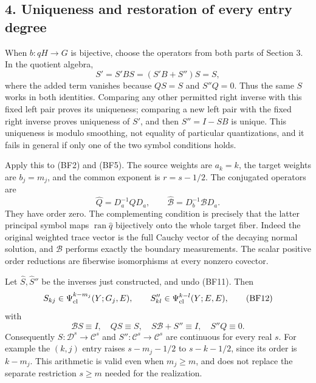 \documentclass[
  11pt,
]{article}
\makeatletter
\let\ReaderOriginalAnchorStart\hyper@anchorstart
\let\ReaderOriginalAnchorEnd\hyper@anchorend
\let\ReaderPendingAliases\@empty
\def\ReaderArmAliases#1{\gdef\ReaderPendingAliases{#1}}
\def\hyper@anchorstart#1{\ReaderIfNativeAnchorTF{#1}{\ReaderPendingAliases\global\let\ReaderPendingAliases\@empty}{}\ReaderOriginalAnchorStart{#1}}
\makeatother
\begin{document}
\ReaderArmAliases{\ReaderOriginalAnchorStart{AN03-GFB-004}\ReaderOriginalAnchorEnd\begingroup\expandafter\def\csname @currentHref\endcsname{AN03-GFB-004}\label{AN03-GFB-004}\endgroup\ReaderOriginalAnchorStart{an03-gfb-004-uniqueness-and-restoration-of-every-entry-degree}\ReaderOriginalAnchorEnd\begingroup\expandafter\def\csname @currentHref\endcsname{an03-gfb-004-uniqueness-and-restoration-of-every-entry-degree}\label{an03-gfb-004-uniqueness-and-restoration-of-every-entry-degree}\endgroup\ReaderOriginalAnchorStart{4-uniqueness-and-restoration-of-every-entry-degree}\ReaderOriginalAnchorEnd\begingroup\expandafter\def\csname @currentHref\endcsname{4-uniqueness-and-restoration-of-every-entry-degree}\label{4-uniqueness-and-restoration-of-every-entry-degree}\endgroup\ReaderOriginalAnchorStart{uniqueness-and-restoration-of-every-entry-degree}\ReaderOriginalAnchorEnd}
\subsection{4. Uniqueness and restoration of every entry
degree}\label{uniqueness-and-restoration-of-every-entry-degree}

When \(b:qH\to G\) is bijective, choose the operators from both parts of
Section 3. In the quotient algebra, \[
 S'=S'BS=(S'B+S'')S=S,
 \tag{BF10}
\] where the added term vanishes because \(QS=S\) and \(S''Q=0\). Thus
the same \(S\) works in both identities. Comparing any other permitted
right inverse with this fixed left pair proves its uniqueness; comparing
a new left pair with the fixed right inverse proves uniqueness of
\(S'\), and then \(S''=I-SB\) is unique. This uniqueness is modulo
smoothing, not equality of particular quantizations, and it fails in
general if only one of the two symbol conditions holds.

Apply this to (BF2) and (BF5). The source weights are \(a_k=k\), the
target weights are \(b_j=m_j\), and the common exponent is \(r=s-1/2\).
The conjugated operators are \[
 \widehat Q=D_a^{-1}QD_a,\qquad
 \widehat{\mathcal B}=D_b^{-1}\mathcal B D_a.
 \tag{BF11}
\] They have order zero. The complementing condition is precisely that
the latter principal symbol maps \(\operatorname{ran}\widehat q\)
bijectively onto the whole target fiber. Indeed the original weighted
trace vector is the full Cauchy vector of the decaying normal solution,
and \(\mathcal B\) performs exactly the boundary measurements. The
scalar positive order reductions are fiberwise isomorphisms at every
nonzero covector.

Let \(\widehat S,\widehat S''\) be the inverses just constructed, and
undo (BF11). Then \[
 S_{kj}\in\Psi^{k-m_j}_{\rm cl}(Y;G_j,E),\qquad
 S''_{kl}\in\Psi^{k-l}_{\rm cl}(Y;E,E),
 \tag{BF12}
\] with \[
 \mathcal BS\equiv I,\quad QS\equiv S,\quad
 S\mathcal B+S''\equiv I,\quad S''Q\equiv0.
 \tag{BF13}
\] Consequently \(S:\mathcal D^s\to\mathcal C^s\) and
\(S'':\mathcal C^s\to\mathcal C^s\) are continuous for every real \(s\).
For example the \((k,j)\) entry raises \(s-m_j-1/2\) to \(s-k-1/2\),
since its order is \(k-m_j\). This arithmetic is valid even when
\(m_j\geq m\), and does not replace the separate restriction \(s\geq m\)
needed for the realization.
\end{document}
